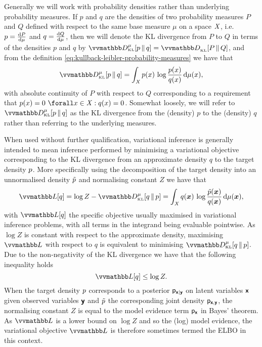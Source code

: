 Generally we will work with probability densities rather than underlying probability measures. If $p$ and $q$ are the densities of two probability measures $P$ and $Q$ defined with respect to the same base measure $\mu$ on a space $\mathit{X}$, i.e. $p = \frac{\mathrm{d} P}{\mathrm{d} \mu}$ and $q = \frac{\mathrm{d} Q}{\mathrm{d} \mu}$, then we will denote the \ac{KL} divergence from $P$ to $Q$ in terms of the densities $p$ and $q$ by $\kldiv[\mu]{p}{q} = \kldiv{P}{Q}$, and from the definition \eqref{eq:kullback-leibler-probability-measures} we have that
\begin{equation}\label{eq:kullback-leibler-probability-densities}
  \kldiv[\mu]{p}{q} =
  \int_{\set{X}} p(x) \, \log\frac{p(x)}{q(x)} \, \dr\mu(x),
\end{equation}
with absolute continuity of $P$ with respect to $Q$ corresponding to a requirement that $p(x) = 0 ~\forall x \in \set{X} : q(x) = 0$. Somewhat loosely, we will refer to $\kldiv[\mu]{p}{q}$ as the \ac{KL} divergence from the (density) $p$ to the (density) $q$ rather than referring to the underlying measures.

When used without further qualification, variational inference is generally intended to mean inference performed by minimising a variational objective corresponding to the \ac{KL} divergence from an approximate density $q$ to the target density $p$. More specifically using the decomposition of the target density into an unnormalised density $\tilde{p}$ and normalising constant $Z$ we have that
\begin{equation}\label{eq:kullback-leibler-var-obj}
  \varobj\lsb q \rsb = \log Z - \kldiv[\mu]{q}{\tgtdens} =
  \int_{\set{X}} q(\vct{x})\,\log \frac{\utgtdens(\vct{x})}{q(\vct{x})} \,\dr\mu(\vct{x}),
\end{equation}
with $\varobj\lsb q \rsb$ the specific objective usually maximised in variational inference problems, with all terms in the integrand being evaluable pointwise. As $\log Z$ is constant with respect to the approximate density, maximising $\varobj$ with respect to $q$ is equivalent to minimising $\kldiv[\mu]{q}{\tgtdens}$. Due to the non-negativity of the \ac{KL} divergence we have that the following inequality holds
\begin{equation}\label{eq:evidence-lower-bound}
  \varobj\lsb q \rsb \leq \log Z.
\end{equation}
When the target density $p$ corresponds to a posterior $\mathsf{p}_{\boldsymbol{\mathsf{x}}|\boldsymbol{\mathsf{y}}}$ on latent variables $\boldsymbol{\mathsf{x}}$ given observed variables $\boldsymbol{\mathsf{y}}$ and $\tilde{p}$ the corresponding joint density $\mathsf{p}_{\boldsymbol{\mathsf{x}},\boldsymbol{\mathsf{y}}}$, the normalising constant $Z$ is equal to the model evidence term $\mathsf{p}_{\boldsymbol{\mathsf{x}}}$ in Bayes' theorem. As $\varobj$ is a lower bound on $\log Z$ and so the (log) model evidence, the variational objective $\varobj$ is therefore sometimes termed the \ac{ELBO} in this context.

